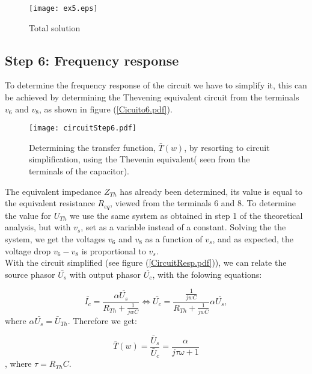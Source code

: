       \begin{figure}[H] \centering
        \texttt{[image: ex5.eps]}
        \caption{Total solution}
        \label{fig:ex5}
        \end{figure}


\subsection{Step 6: Frequency response}
  To determine the frequency response of the circuit we have to simplify it, this can be achieved by determining the Thevening equivalent circuit from the terminals $v_6$ and $v_8$, as shown in figure (\ref{Cicuito6.pdf}).
        
        \begin{figure}[H] \centering
          \texttt{[image: circuitStep6.pdf]}
          \caption{Determining the transfer function, $\bar{T}(w)$, by resorting to circuit simplification, using the Thevenin equivalent( seen from the terminals of the capacitor).}
          \label{fig:mesh}
        \end{figure}
        
        
        
        The equivalent impedance $Z_{Th}$ has already been determined, its value is equal to the equivalent resistance $R_{eq}$, viewed from the terminals 6 and 8. To determine the value for $U_{Th}$ we use the same system as obtained in step 1 of the theoretical analysis, but with $v_s$, set as a variable instead of a constant. Solving the the system, we get the voltages $v_6$ and $v_8$ as a function of $v_s$, and as expected, the voltage drop $v_6 - v_8$ is proportional to $v_s$.
        \\ With the circuit simplified (see figure (\ref{CircuitResp.pdf})), we can relate the source phasor $\bar{U_s}$ with output phasor $\bar{U_c}$, with the folowing equations:
        
        \begin{equation}
            \bar{I_c} = \frac{\alpha \bar{U_s}}{R_{Th}+ \frac{1}{jwC}} \iff \bar{U_c} = \frac{\frac{1}{jwC}}{R_{Th} +  \frac{1}{jwC}} \alpha \bar{U_s}, 
        \end{equation}
        where $\alpha \bar{U_s} = \bar{U}_{Th}$.
        Therefore we get:
        
        \begin{equation}\label{eq: freqResp}
        \bar{T}(w) = \frac{\bar{U}_s}{\bar{U}_c} = \frac{\alpha}{j \tau \omega + 1} \end{equation}
        , where $\tau = R_{Th}C$.



